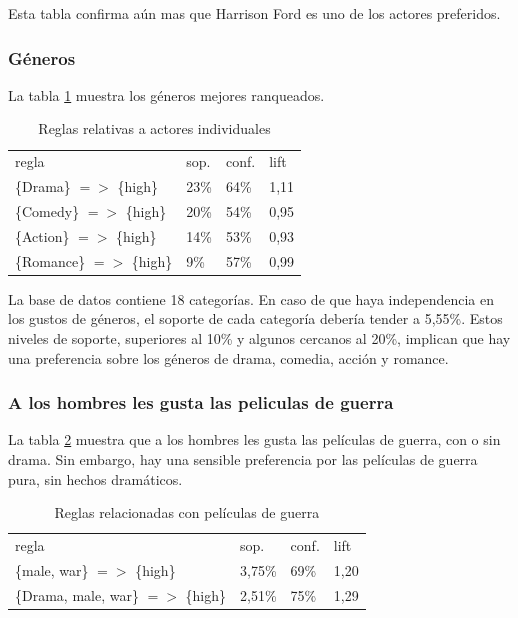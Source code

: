 \documentclass[journal]{IEEEtran}
\begin{document}
Esta tabla confirma aún mas que Harrison Ford es uno de los actores preferidos.

\subsubsection{Géneros}
La tabla \ref{table_genre} muestra los géneros mejores ranqueados.
\begin{table}[ht!]
\caption{Reglas relativas a actores individuales}
\label{table_genre}
\centering
\begin{tabular}{l l l l }
regla & sop. & conf. & lift \\
\{Drama\} $=$$>$ \{high\} & 23\% & 64\% & 1,11 \\
\{Comedy\} $=$$>$ \{high\} & 20\% & 54\% & 0,95 \\
\{Action\} $=$$>$ \{high\} & 14\% & 53\% & 0,93 \\
\{Romance\} $=$$>$ \{high\} & 9\% & 57\% & 0,99 \\
\end{tabular}
\end{table}

La base de datos contiene 18 categorías. En caso de que haya independencia en 
los gustos de géneros, el soporte de cada categoría debería tender a 5,55\%. 
Estos niveles de soporte, superiores al 10\% y algunos cercanos al 20\%,
implican que hay una preferencia sobre los géneros de drama, comedia,
acción y romance.

\subsubsection{A los hombres les gusta las peliculas de guerra}
La tabla \ref{table_male_ware} muestra que a los hombres
les gusta las películas de guerra, con o sin drama. Sin embargo,
hay una sensible preferencia por las películas de guerra 
pura, sin hechos dramáticos.

\begin{table}[ht!]
\caption{Reglas relacionadas con películas de guerra}
\label{table_male_ware}
\centering
\begin{tabular}{l l l l }
regla & sop. & conf. & lift \\
\{male, war\} $=$$>$ \{high\} & 3,75\% & 69\% & 1,20 \\
\{Drama, male, war\} $=$$>$ \{high\} & 2,51\% & 75\% & 1,29 \\
\end{tabular}
\end{table}
\end{document}

